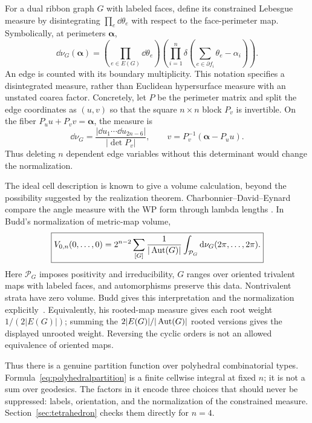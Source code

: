 For a dual ribbon graph $G$ with labeled faces, define its constrained
Lebesgue measure by disintegrating $\prod_e\dd\theta_e$ with respect to the
face-perimeter map. Symbolically, at perimeters $\boldsymbol\alpha$,
\begin{equation}
 \dd\nu_G(\boldsymbol\alpha)=
 \left(\prod_{e\in E(G)}\dd\theta_e\right)
 \left(\prod_{i=1}^{n}
 \delta\left(\sum_{e\in\partial f_i}\theta_e-\alpha_i\right)\right).
 \label{eq:deltameasure}
\end{equation}
An edge is counted with its boundary multiplicity. This notation specifies
a disintegrated measure, rather than Euclidean hypersurface measure with an
unstated coarea factor.
Concretely, let $P$ be the perimeter matrix and split the edge coordinates
as $(u,v)$ so that the square $n\times n$ block $P_v$ is invertible.
On the fiber $P_u u+P_vv=\boldsymbol\alpha$, the measure is
\[
 \dd\nu_G=\frac{|\dd u_1\cdots\dd u_{2n-6}|}{|\det P_v|},
 \qquad v=P_v^{-1}(\boldsymbol\alpha-P_u u).
\]
Thus deleting $n$ dependent edge variables without this determinant would
change the normalization.

The ideal cell description is known to give a volume calculation, beyond
the possibility suggested by the realization theorem. Charbonnier--David--Eynard
compare the angle measure with the WP form through lambda lengths
\cite[Section 3.2]{CDE}. In Budd's normalization of metric-map volume,
\begin{equation}
 \boxed{
 V_{0,n}(0,\ldots,0)=
 2^{n-2}\sum_{[G]}\frac{1}{|\operatorname{Aut}(G)|}
 \int_{\mathcal P_G}\mathop{}\!\mathrm d\nu_G(2\pi,\ldots,2\pi).}
 \label{eq:polyhedralpartition}
\end{equation}
Here $\mathcal P_G$ imposes positivity and irreducibility, $G$ ranges over
oriented trivalent maps with labeled faces, and automorphisms preserve this
data. Nontrivalent strata have zero volume. Budd gives this interpretation
and the normalization explicitly~\cite[Section 1.3]{Budd}.
Equivalently, his rooted-map measure gives each root weight
$1/(2|E(G)|)$; summing the $2|E(G)|/|\operatorname{Aut}(G)|$ rooted versions gives
the displayed unrooted weight. Reversing the cyclic orders is not an
allowed equivalence of oriented maps.

Thus there is a genuine partition function over polyhedral combinatorial
types. Formula~\eqref{eq:polyhedralpartition} is a finite cellwise integral
at fixed $n$; it is not a sum over geodesics. The factors in it encode three
choices that should never be suppressed: labels, orientation, and the
normalization of the constrained measure. Section~\ref{sec:tetrahedron}
checks them directly for $n=4$.

